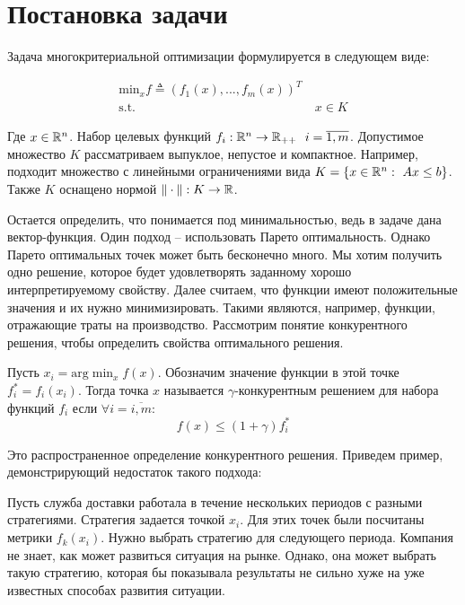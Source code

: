 \section{Постановка задачи}\label{sec:task_statement}

Задача многокритериальной оптимизации формулируется в следующем виде: 

\begin{align*}
    \text{min}_{x} f \triangleq (f_1(x), ..., f_m(x))^T & \tag{$T_0$}\label{opt:T0}\\
    \text{s.t.} &~ x\in K 
\end{align*}

Где $x\in {\mathbb R}^n$. Набор целевых функций $f_i: {\mathbb R}^n \rightarrow {\mathbb R}_{++} ~~ i = \overline{1, m}$. Допустимое множество $K$ рассматриваем выпуклое, непустое и компактное. Например, подходит множество с линейными ограничениями вида $K = \{x\in {\mathbb R}^n:~ Ax\leq b\}$. Также $K$ оснащено нормой $\|\cdot\|: K \rightarrow {\mathbb R}$.

Остается определить, что понимается под минимальностью, ведь в задаче дана вектор-функция. Один подход -- использовать Парето оптимальность. Однако Парето оптимальных точек может быть бесконечно много. Мы хотим получить одно решение, которое будет удовлетворять заданному хорошо интерпретируемому свойству. Далее считаем, что функции имеют положительные значения и их нужно минимизировать. Такими являются, например, функции, отражающие траты на производство. Рассмотрим понятие конкурентного решения, чтобы определить  свойства оптимального решения.

\begin{definition} %
     Пусть $x_i = \text{arg}\min_{x} f(x)$. Обозначим значение функции в этой точке $f_i^* = f_i(x_i)$. Тогда точка $x$ называется $\gamma$-конкурентным решением для набора функций $f_i$ если  $\forall i = \overline{i,m}$:
    $$
    f(x) \leq (1 + \gamma) f_i^*
    $$
\end{definition}

Это распространенное определение конкурентного решения. Приведем пример, демонстрирующий недостаток такого подхода:

\begin{comments}\label{example:1}
    Пусть служба доставки работала в течение нескольких периодов с разными стратегиями. Стратегия задается точкой $x_i$. Для этих точек были посчитаны метрики $f_k(x_i)$. Нужно выбрать стратегию для следующего периода. Компания не знает, как может развиться ситуация на рынке. Однако, она может выбрать такую стратегию, которая бы показывала результаты не сильно хуже на уже известных способах развития ситуации.
\end{comments}

